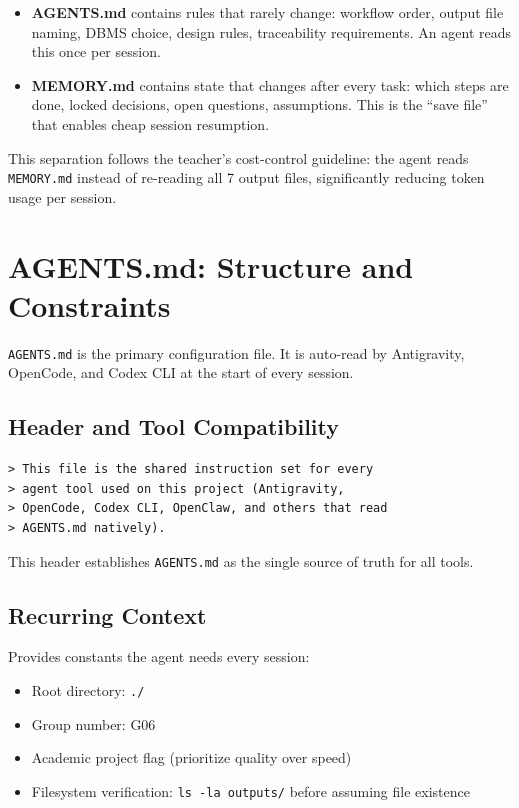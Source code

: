 \documentclass[12pt,a4paper]{article}
\begin{document}
\begin{itemize}
    \item \textbf{AGENTS.md} contains rules that rarely change: workflow order, output file naming, DBMS choice, design rules, traceability requirements. An agent reads this once per session.
    \item \textbf{MEMORY.md} contains state that changes after every task: which steps are done, locked decisions, open questions, assumptions. This is the ``save file'' that enables cheap session resumption.
\end{itemize}

This separation follows the teacher's cost-control guideline: the agent reads \texttt{MEMORY.md} instead of re-reading all 7 output files, significantly reducing token usage per session.

\section{AGENTS.md: Structure and Constraints}

\texttt{AGENTS.md} is the primary configuration file. It is auto-read by Antigravity, OpenCode, and Codex CLI at the start of every session.

\subsection{Header and Tool Compatibility}

\begin{lstlisting}
> This file is the shared instruction set for every
> agent tool used on this project (Antigravity,
> OpenCode, Codex CLI, OpenClaw, and others that read
> AGENTS.md natively).
\end{lstlisting}

This header establishes \texttt{AGENTS.md} as the single source of truth for all tools.

\subsection{Recurring Context}

Provides constants the agent needs every session:
\begin{itemize}
    \item Root directory: \texttt{./}
    \item Group number: G06
    \item Academic project flag (prioritize quality over speed)
    \item Filesystem verification: \texttt{ls -la outputs/} before assuming file existence
\end{itemize}
\end{document}
